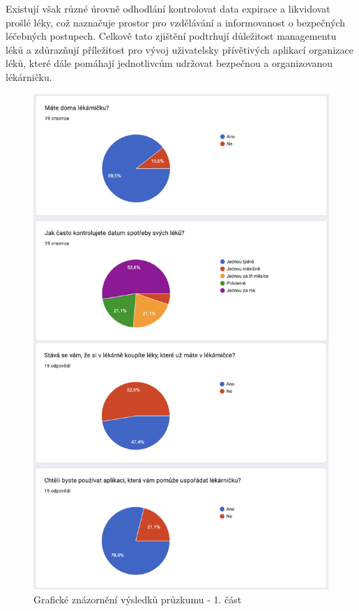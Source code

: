 \documentclass[a4paper, 11pt]{article}
\begin{document}
Existují však různé úrovně odhodlání kontrolovat data expirace a likvidovat prošlé léky, což naznačuje prostor pro vzdělávání a informovanost o bezpečných léčebných postupech. Celkově tato zjištění podtrhují důležitost managementu léků a zdůrazňují příležitost pro vývoj uživatelsky přívětivých aplikací organizace léků, které dále pomáhají jednotlivcům udržovat bezpečnou a organizovanou lékárničku.

\newpage
\begin{figure}[!ht]
		\centering
		\includegraphics[width=\textwidth,height=\textheight,keepaspectratio]{Pruzkum.pdf}
		\caption{Grafické znázornění výsledků průzkumu - 1. část}
		\label{figure:pruzkum}
	\end{figure}
\end{document}

